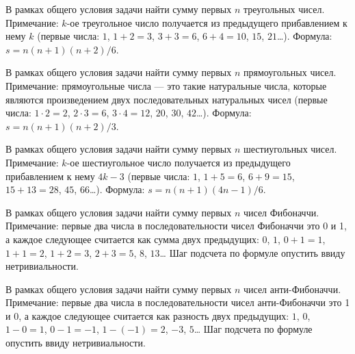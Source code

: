 
\begin{zztask}
В рамках общего условия задачи найти сумму первых $n$ треугольных чисел.
Примечание: $k$-ое треугольное число получается из предыдущего прибавлением
к нему $k$ (первые числа: $1$, $1+2=3$, $3+3=6$, $6+4=10$, $15$, $21$\dots).
Формула: $s = n(n+1)(n+2)/6$.
\end{zztask}


\begin{zztask}
В рамках общего условия задачи найти сумму первых $n$ прямоугольных чисел.
Примечание: прямоугольные числа --- это такие натуральные числа, которые
являются произведением двух последовательных натуральных чисел
(первые числа: $1\cdot2=2$, $2\cdot3=6$, $3\cdot4=12$, $20$, $30$, $42$\dots).
Формула: $s = n(n+1)(n+2)/3$.
\end{zztask}


\begin{zztask}
В рамках общего условия задачи найти сумму первых $n$ шестиугольных чисел.
Примечание: $k$-ое шестиугольное число получается из предыдущего прибавлением
к нему $4k-3$ (первые числа: $1$, $1+5=6$, $6+9=15$, $15+13=28$, $45$, $66$\dots).
Формула: $s = n(n+1)(4n-1)/6$.
\end{zztask}


\begin{zztask}
В рамках общего условия задачи найти сумму первых $n$ чисел Фибоначчи.
Примечание: первые
два числа в последовательности чисел Фибоначчи это 0 и 1, а каждое следующее
считается как сумма двух предыдущих: $0$, $1$, $0+1=1$, $1+1=2$, $1+2=3$, $2+3=5$,
$8$, $13$\dots
Шаг подсчета по формуле опустить ввиду нетривиальности.
\end{zztask}


\begin{zztask}
В рамках общего условия задачи найти сумму первых $n$ чисел анти-Фибоначчи.
Примечание: первые
два числа в последовательности чисел анти-Фибоначчи это 1 и 0, а каждое
следующее считается как разность двух предыдущих: $1$, $0$, $1-0=1$, $0-1=-1$,
$1-(-1)=2$, $-3$, $5$\dots
Шаг подсчета по формуле опустить ввиду нетривиальности.
\end{zztask}

